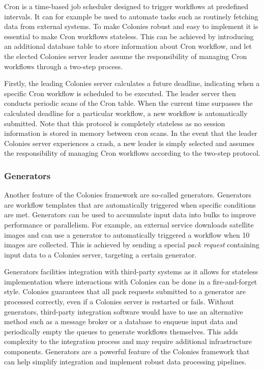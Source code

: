 \documentclass{article}
\begin{document}
Cron is a time-based job scheduler designed to trigger workflows at predefined intervals. It can for example be used to automate tasks such as routinely fetching data from external systems. To make Colonies robust and easy to implement it is essential to make Cron workflows stateless. This can be achieved by introducing an additional database table to store information about Cron workflow, and let the elected Colonies server leader assume the responsibility of managing Cron workflows through a two-step process. 

Firstly, the leading Colonies server calculates a future deadline, indicating when a specific Cron workflow is scheduled to be executed. The leader server then conducts periodic scans of the Cron table. When the current time surpasses the calculated deadline for a particular workflow, a new workflow is automatically submitted. Note that this protocol is completely stateless as no session information is stored in memory between cron scans. In the event that the leader Colonies server experiences a crash, a new leader is simply selected and assumes the responsibility of managing Cron workflows according to the two-step protocol.

\subsubsection{Generators}
Another feature of the Colonies framework are so-called generators. Generators are workflow templates that are automatically triggered when specific conditions are met. Generators can be used to accumulate input data into bulks to improve performance or parallelism. For example, an external service downloads satellite images and can use a generator to automatically triggered a workflow when 10 images are collected. This is achieved by sending a special \emph{pack request} containing input data to a Colonies server, targeting a certain generator. 

Generators facilities integration with third-party systems as it allows for stateless implementation where interactions with Colonies can be done in a fire-and-forget style. Colonies guarantees that all pack requests submitted to a generator are processed correctly, even if a Colonies server is restarted or fails. Without generators, third-party integration software would have to use an alternative method such as a message broker or a database to enqueue input data and periodically empty the queues to generate workflows themselves. This adds complexity to the integration process and may require additional infrastructure components. Generators are a powerful feature of the Colonies framework that can help simplify integration and implement robust data processing pipelines.
\end{document}
